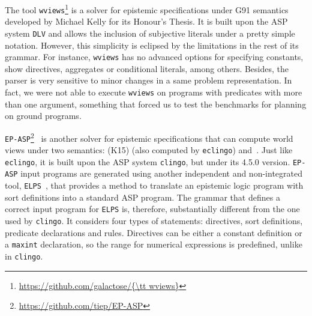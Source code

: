 \documentclass{new_tlp}
\def\eclingo{{\tt eclingo}}
\def\clingo{{\tt clingo}}
\def\wviews{{\tt wviews}}
\def\EPASP{{\tt EP-ASP}}
\begin{document}
The tool \wviews\footnote{\url{https://github.com/galactose/\wviews}} is a solver for epistemic specifications under G91 semantics developed by Michael Kelly for its Honour's Thesis. It is built upon the ASP system {\tt DLV} and allows the inclusion of subjective literals under a pretty simple notation. However, this simplicity is eclipsed by the limitations in the rest of its grammar. For instance, \wviews{} has no advanced options for specifying constants, show directives, aggregates or conditional literals, among others. Besides, the parser is very sensitive to minor changes in a same problem representation. In fact, we were not able to execute \wviews{} on programs with predicates with more than one argument, something that forced us to test the benchmarks for planning on ground programs.

\EPASP\footnote{\url{https://github.com/tiep/EP-ASP}}~\cite{SLKL17} is another solver for epistemic specifications that can compute world views under two semantics: \cite{kawabagezh15} (K15)  (also computed by \eclingo{}) and~\cite{sheeit17a}. Just like \eclingo{}, it is built upon the ASP system \clingo, but under its 4.5.0 version. \EPASP{} input programs are generated using another independent and non-integrated tool, {\tt ELPS}~\cite{BK14}, that provides a method to translate an epistemic logic program with sort definitions into a standard ASP program. The grammar that defines a correct input program for {\tt ELPS} is, therefore, substantially different from the one used by \clingo{}. It considers four types of statements: directives, sort definitions, predicate declarations and rules. Directives can be either a constant definition or a {\tt maxint} declaration, so the range for numerical expressions is predefined, unlike in \clingo{}.

\end{document}
